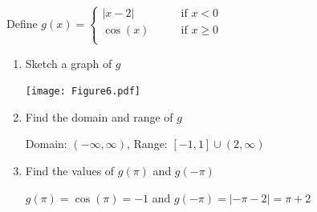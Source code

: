 \documentclass[nooutcomes]{ximera}
\begin{document}
\begin{problem}
Define 
	$g(x) =   \left\{ \begin{array}{cl}
	|x-2|		 	&	\qquad \text{if } x < 0					\\
	\cos(x)			&	\qquad \text{if }  x \geq 0  	\\		\end{array} \right.  $
\begin{enumerate}	
	\item  Sketch a graph of $g$
		\begin{freeResponse} \hfil
			\begin{image}			
			\texttt{[image: Figure6.pdf]}
			\end{image}

		\end{freeResponse}

	\item  Find the domain and range of $g$
		\begin{freeResponse}	
			Domain: $(-\infty,\infty)$, Range: $[-1,1]\cup(2,\infty)$
		\end{freeResponse}		
	
	\item  Find the values of $g(\pi)$ and $g(-\pi)$
		\begin{freeResponse}	
			$g(\pi)=\cos (\pi)=-1$ and $g(-\pi)=|-\pi-2|=\pi+2$
		\end{freeResponse}
	
	\end{enumerate}

\end{problem}
\end{document}
